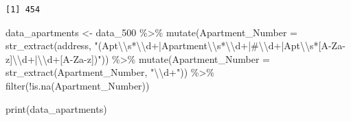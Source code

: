 \documentclass[
  12pt,
]{article}
\newenvironment{Shaded}{\begin{snugshade}}{\end{snugshade}}
\newcommand{\AttributeTok}[1]{\textcolor[rgb]{0.40,0.45,0.13}{#1}}
\newcommand{\FunctionTok}[1]{\textcolor[rgb]{0.28,0.35,0.67}{#1}}
\newcommand{\NormalTok}[1]{\textcolor[rgb]{0.00,0.23,0.31}{#1}}
\newcommand{\OtherTok}[1]{\textcolor[rgb]{0.00,0.23,0.31}{#1}}
\newcommand{\SpecialCharTok}[1]{\textcolor[rgb]{0.37,0.37,0.37}{#1}}
\newcommand{\StringTok}[1]{\textcolor[rgb]{0.13,0.47,0.30}{#1}}
\begin{document}
\begin{verbatim}
[1] 454
\end{verbatim}

\begin{Shaded}
\begin{Highlighting}[]
\NormalTok{data\_apartments }\OtherTok{\textless{}{-}}\NormalTok{ data\_500 }\SpecialCharTok{\%\textgreater{}\%}
  \FunctionTok{mutate}\NormalTok{(}\AttributeTok{Apartment\_Number =} \FunctionTok{str\_extract}\NormalTok{(address, }\StringTok{"(Apt}\SpecialCharTok{\textbackslash{}\textbackslash{}}\StringTok{s*}\SpecialCharTok{\textbackslash{}\textbackslash{}}\StringTok{d+|Apartment}\SpecialCharTok{\textbackslash{}\textbackslash{}}\StringTok{s*}\SpecialCharTok{\textbackslash{}\textbackslash{}}\StringTok{d+|\#}\SpecialCharTok{\textbackslash{}\textbackslash{}}\StringTok{d+|Apt}\SpecialCharTok{\textbackslash{}\textbackslash{}}\StringTok{s*[A{-}Za{-}z]}\SpecialCharTok{\textbackslash{}\textbackslash{}}\StringTok{d+|}\SpecialCharTok{\textbackslash{}\textbackslash{}}\StringTok{d+[A{-}Za{-}z])"}\NormalTok{)) }\SpecialCharTok{\%\textgreater{}\%}
  \FunctionTok{mutate}\NormalTok{(}\AttributeTok{Apartment\_Number =} \FunctionTok{str\_extract}\NormalTok{(Apartment\_Number, }\StringTok{"}\SpecialCharTok{\textbackslash{}\textbackslash{}}\StringTok{d+"}\NormalTok{)) }\SpecialCharTok{\%\textgreater{}\%}
  \FunctionTok{filter}\NormalTok{(}\SpecialCharTok{!}\FunctionTok{is.na}\NormalTok{(Apartment\_Number))}
\end{Highlighting}
\end{Shaded}

\begin{Shaded}
\begin{Highlighting}[]
\FunctionTok{print}\NormalTok{(data\_apartments)}
\end{Highlighting}
\end{Shaded}
\end{document}
